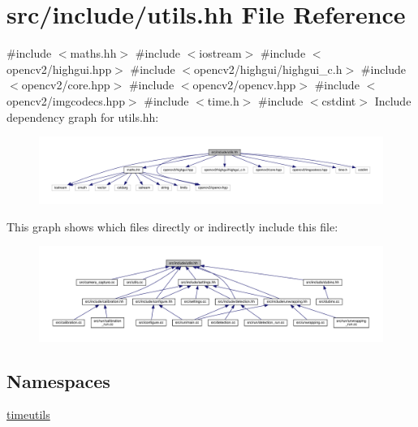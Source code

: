 \hypertarget{utils_8hh}{}\section{src/include/utils.hh File Reference}
\label{utils_8hh}
{\ttfamily \#include $<$maths.\+hh$>$}\newline
{\ttfamily \#include $<$iostream$>$}\newline
{\ttfamily \#include $<$opencv2/highgui.\+hpp$>$}\newline
{\ttfamily \#include $<$opencv2/highgui/highgui\+\_\+c.\+h$>$}\newline
{\ttfamily \#include $<$opencv2/core.\+hpp$>$}\newline
{\ttfamily \#include $<$opencv2/opencv.\+hpp$>$}\newline
{\ttfamily \#include $<$opencv2/imgcodecs.\+hpp$>$}\newline
{\ttfamily \#include $<$time.\+h$>$}\newline
{\ttfamily \#include $<$cstdint$>$}\newline
Include dependency graph for utils.\+hh\+:
\nopagebreak
\begin{figure}[H]
\begin{center}
\leavevmode
\includegraphics[width=350pt]{utils_8hh__incl}
\end{center}
\end{figure}
This graph shows which files directly or indirectly include this file\+:
\nopagebreak
\begin{figure}[H]
\begin{center}
\leavevmode
\includegraphics[width=350pt]{utils_8hh__dep__incl}
\end{center}
\end{figure}
\subsection*{Namespaces}
\begin{DoxyCompactItemize}
\item 
 \mbox{\hyperlink{namespacetimeutils}{timeutils}}
\end{DoxyCompactItemize}

